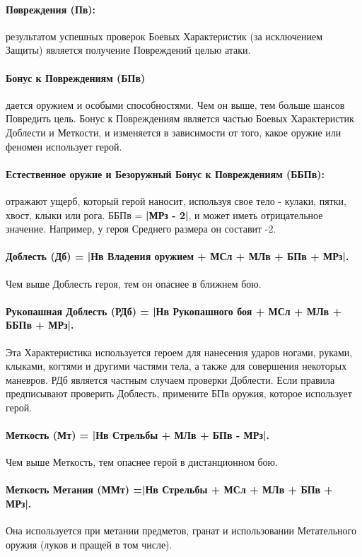 \paragraph{Повреждения (Пв):} результатом успешных проверок Боевых Характеристик (за исключением Защиты) является получение Повреждений целью атаки.
\paragraph{Бонус к Повреждениям (БПв)} дается оружием и особыми способностями. Чем он выше, тем больше шансов Повредить цель. Бонус к Повреждениям является частью Боевых Характеристик Доблести и Меткости, и изменяется в зависимости от того, какое оружие или феномен использует герой.
\paragraph{Естественное оружие и Безоружный Бонус к Повреждениям (ББПв):} отражают ущерб, который герой наносит, используя свое тело - кулаки, пятки, хвост, клыки или рога. ББПв = \textbf{|МРз - 2|}, и может иметь отрицательное значение. Например, у героя Среднего размера он составит -2.
\paragraph{Доблесть (Дб) = |Нв Владения оружием + МСл + МЛв + БПв + МРз|.} Чем выше Доблесть героя, тем он опаснее в ближнем бою.
\paragraph{Рукопашная Доблесть (РДб) = |Нв Рукопашного боя + МСл + МЛв + ББПв + МРз|.} Эта Характеристика используется героем для нанесения ударов ногами, руками, клыками, когтями и другими частями тела, а также для совершения некоторых маневров.
\newline РДб является частным случаем проверки Доблести.
\newline Если правила предписывают проверить Доблесть, примените БПв оружия, которое использует герой.
\paragraph{Меткость (Мт) = |Нв Стрельбы + МЛв + БПв - МРз|.} Чем выше Меткость, тем опаснее герой в дистанционном бою. 
\paragraph{Меткость Метания (ММт) =|Нв Стрельбы + МСл + МЛв + БПв + МРз|.} Она используется при метании предметов, гранат и использовании Метательного оружия (луков и пращей в том числе). 
